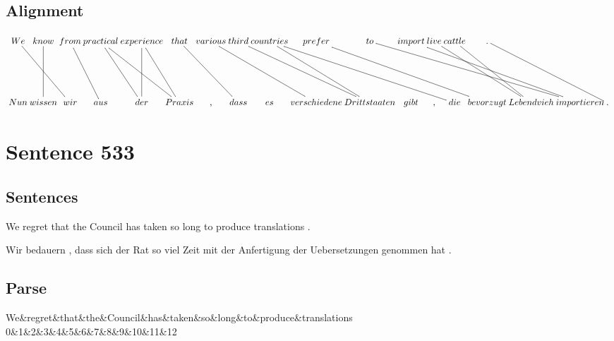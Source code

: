 \documentclass{report}
\begin{document}
\subsection*{Alignment}
\scriptsize{
$
\xymatrix@C-2.3pc{
We \ar @{-} [ddrr] & know \ar @{-} [dd] & from \ar @{-} [ddr] & practical \ar @{-} [ddr] \ar @{-} [ddrr] & experience \ar @{-} [ddr] \ar @{-} [dd] & that \ar @{-} [ddrr] & various \ar @{-} [ddrrr] & third \ar @{-} [ddrrr] & countries \ar @{-} [ddrrrrr] \ar @{-} [ddrr] & prefer \ar @{-} [ddrrrrr] & to \ar @{-} [ddrrrrrr] & import \ar @{-} [ddrrrrr] & live \ar @{-} [ddrrr] & cattle \ar @{-} [ddrr] & . \ar @{-} [ddrrr]\\\\
Nun & wissen & wir & aus & der & Praxis & , & dass & es & verschiedene & Drittstaaten & gibt & , & die & bevorzugt & Lebendvieh & importieren & .
}$}
\newpage\section*{Sentence 533}

\subsection*{Sentences}
We regret that the Council has taken so long to produce translations .

\noindent Wir bedauern , dass sich der Rat so viel Zeit mit der Anfertigung der Uebersetzungen genommen hat .



\subsection*{Parse}
\begin{dependency}[theme=simple]
\begin{deptext}[column sep=.5cm, row sep=.1ex]
We\&regret\&that\&the\&Council\&has\&taken\&so\&long\&to\&produce\&translations\\
0\&1\&2\&3\&4\&5\&6\&7\&8\&9\&10\&11\&12\\
\end{deptext}
\end{dependency}
\end{document}
